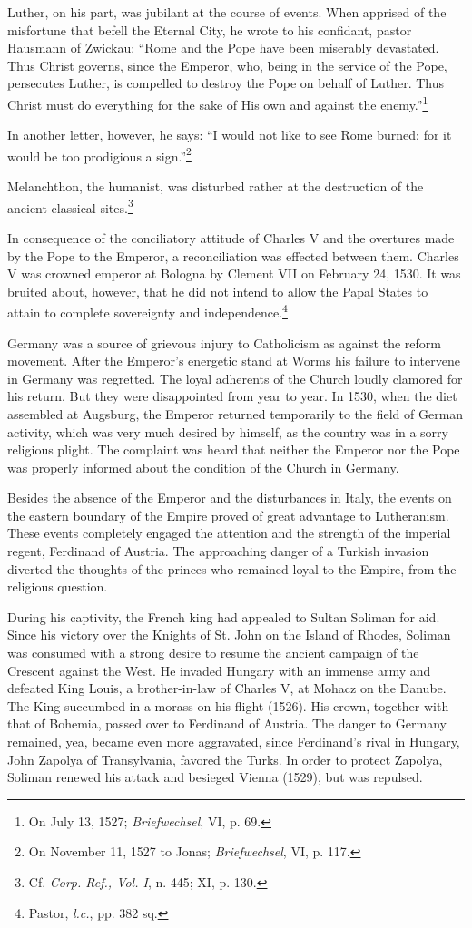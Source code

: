 Luther, on his part, was jubilant at the course of events. When
apprised of the misfortune that befell the Eternal City, he wrote to
his confidant, pastor Hausmann of Zwickau: “Rome and the Pope
have been miserably devastated. Thus Christ governs, since the Emperor,
who, being in the service of the Pope, persecutes Luther, is
compelled to destroy the Pope on behalf of Luther. Thus Christ must
do everything for the sake of His own and against the enemy.”\footnote{On July 13, 1527; \textit{Briefwechsel}, VI, p. 69.}

In another letter, however, he says: “I would not like to see Rome
burned; for it would be too prodigious a sign.”\footnote{On November 11, 1527 to Jonas; \textit{Briefwechsel}, VI, p. 117.}

Melanchthon, the
humanist, was disturbed rather at the destruction of the ancient
classical sites.\footnote{Cf. \textit{Corp. Ref., Vol. I}, n. 445; XI, p. 130.}


In consequence of the conciliatory attitude of Charles V and the
overtures made by the Pope to the Emperor, a reconciliation was effected
between them. Charles V was crowned emperor at Bologna
by Clement VII on February 24, 1530. It was bruited about, however,
that he did not intend to allow the Papal States to attain to complete
sovereignty and independence.\footnote{Pastor, \textit{l.c.}, pp. 382 sq.}

Germany was a source of grievous injury to Catholicism as against
the reform movement. After the Emperor’s energetic stand at Worms
his failure to intervene in Germany was regretted. The loyal adherents
of the Church loudly clamored for his return. But they were disappointed
from year to year. In 1530, when the diet assembled at
Augsburg, the Emperor returned temporarily to the field of German
activity, which was very much desired by himself, as the country was
in a sorry religious plight. The complaint was heard that neither the
Emperor nor the Pope was properly informed about the condition of
the Church in Germany.

Besides the absence of the Emperor and the disturbances in Italy,
the events on the eastern boundary of the Empire proved of great advantage
to Lutheranism. These events completely engaged the attention and the
strength of the imperial regent, Ferdinand of Austria.
The approaching danger of a Turkish invasion diverted the thoughts
of the princes who remained loyal to the Empire, from the religious
question.

During his captivity, the French king had appealed to Sultan
Soliman for aid. Since his victory over the Knights of St. John on the
Island of Rhodes, Soliman was consumed with a strong desire to resume
the ancient campaign of the Crescent against the West. He invaded Hungary
with an immense army and defeated King Louis, a
brother-in-law of Charles V, at Mohacz on the Danube. The King
succumbed in a morass on his flight (1526). His crown, together
with that of Bohemia, passed over to Ferdinand of Austria. The danger
to Germany remained, yea, became even more aggravated, since
Ferdinand’s rival in Hungary, John Zapolya of Transylvania, favored
the Turks. In order to protect Zapolya, Soliman renewed his attack
and besieged Vienna (1529), but was repulsed.


